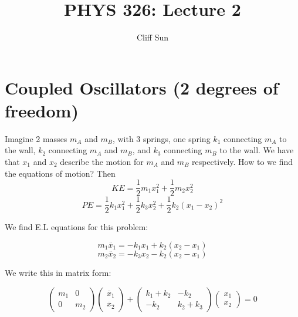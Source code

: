 \documentclass{article}
\title{PHYS 326: Lecture 2}
\author{Cliff Sun}
\newtheorem{one minute paper}[theorem]{One Minute Paper}
\begin{document}
\maketitle

\section*{Coupled Oscillators (2 degrees of freedom)}

Imagine 2 masses $m_A$ and $m_B$, with 3 springs, one spring $k_1$ connecting $m_A$ to the wall, $k_2$ connecting $m_A$ and $m_B$, and $k_3$ connecting $m_B$ to the wall.
We have that $x_1$ and $x_2$ describe the motion for $m_A$ and $m_B$ respectively. How to we find the equations of motion? Then 
\begin{equation}
    KE = \frac{1}{2}m_1x_1^2 + \frac{1}{2}m_2x_2^2
\end{equation} 
\begin{equation}
    PE = \frac{1}{2}k_1x_1^2 + \frac{1}{2}k_3x_2^2 + \frac{1}{2}k_2(x_1-x_2)^2
\end{equation}

We find E.L equations for this problem:

\begin{equation}
    m_1\ddot{x_1} = -k_1x_1 + k_2(x_2 - x_1)
\end{equation}
\begin{equation}
    m_2\ddot{x_2} = -k_3x_2 - k_2(x_2 - x_1)
\end{equation}

We write this in matrix form:

\begin{equation}
    \begin{pmatrix}
        m_1 & 0 \\
        0 & m_2
    \end{pmatrix}\begin{pmatrix}
        \ddot{x_1} \\
        \ddot{x_2}
    \end{pmatrix} + \begin{pmatrix}
        k_1 + k_2 & -k_2 \\
        -k_2 & k_2 + k_3 
    \end{pmatrix}\begin{pmatrix}
        x_1 \\
        x_2
    \end{pmatrix} = 0
\end{equation}
\end{document}
